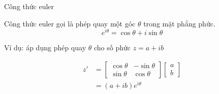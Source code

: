 \begin{frame}{Công thức euler}
    \begin{mdframed}[backgroundcolor=BlueDefault!10, linecolor=BlueDefault, linewidth=0.5pt, roundcorner=1pt]
        Công thức euler gọi là phép quay một góc \(\theta\) trong mặt phẳng phức.
        \begin{equation}
            e^{i\theta} = \cos{\theta} + i \sin{\theta}
            \label{eq:1.1_2}
        \end{equation}
    \end{mdframed}
    \vspace{2mm}
    
    Ví dụ: áp dụng phép quay \(\theta\) cho số phức \(z = a + i b\)
    \begin{center}
        \begin{minipage}{0.4\linewidth}
            \begin{equation*}
            \begin{split}
                z' &= \left[\begin{array}{cc}
               \cos{\theta}  & -\sin{\theta} \\
               \sin{\theta}  & \cos{\theta}
            \end{array} \right] \left[
            \begin{array}{c}
                a \\
                b
            \end{array}
            \right]  \\
            &= (a + i b) e^{i\theta}
            \end{split}
            \end{equation*}
        \end{minipage}
        \hspace{1mm}
        \begin{minipage}{0.4\linewidth}
            \begin{center}
                \resizebox{1\linewidth}{!}{}
            \end{center}
        \end{minipage}
    \end{center}
\end{frame}
